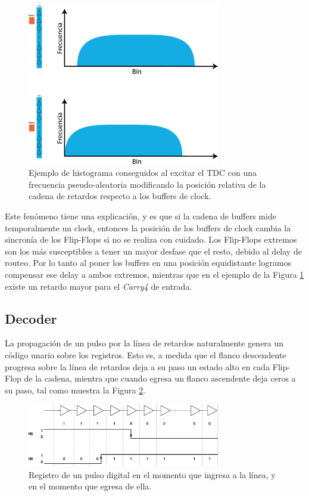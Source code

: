 \begin{figure}[H]
     \centering
     \includegraphics[width=0.75\textwidth]{imagenes/problema_buffer.eps}
     \caption{Ejemplo de histograma conseguidos al excitar el TDC con una frecuencia pseudo-aleatoria 
     modificando la posición relativa de la cadena de retardos respecto a los buffers de clock.}
     \label{fig: problema buffer}
\end{figure}

Este fenómeno tiene una explicación, y es que si la cadena de buffers mide temporalmente un clock, entonces
la posición de los buffers de clock cambia la sincronía de los Flip-Flops si no se realiza con cuidado. Los Flip-Flops
extremos son los más susceptibles a tener un mayor desfase que el resto, debido al delay de routeo. Por lo tanto al poner los buffers 
en una posición equidistante logramos compensar ese delay a ambos extremos, mientras que en el ejemplo de la Figura \ref{fig: problema buffer} 
existe un retardo mayor para el \textit{Carry4} de entrada. 


\subsection{Decoder}
La propagación de un pulso por la línea de retardos naturalmente genera un código unario sobre los registros. Esto
es, a medida que el flanco descendente progresa sobre la línea de retardos deja a su paso un estado alto en cada Flip-Flop de la cadena, mientra que
cuando egresa un flanco ascendente deja ceros a su paso, tal como muestra la Figura \ref{fig: tdl_flancos}.

\begin{figure}[H]
     \centering
     \includegraphics[width=0.75\textwidth]{imagenes/tdl_flancos.eps}
     \caption{Registro de un pulso digital en el momento que ingresa a la línea, y en el momento
     que egresa de ella.}
     \label{fig: tdl_flancos}
\end{figure}

